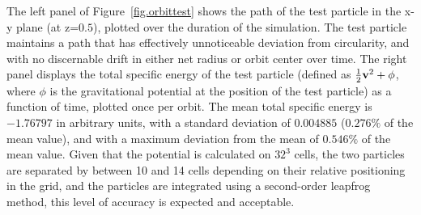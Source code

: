 The left panel of Figure~\ref{fig.orbittest} shows the path of the
test particle in the x-y plane (at z=$0.5$), plotted over the duration
of the simulation.  The test particle maintains a path that has
effectively unnoticeable deviation from circularity, and with no
discernable drift in either net radius or orbit center over time.  The
right panel displays the total specific energy of the test particle
(defined as $\frac{1}{2} {\bf v}^2 + \phi$, where $\phi$ is the
gravitational potential at the position of the test particle) as a
function of time, plotted once per orbit.  The mean total specific
energy is $-1.76797$ in arbitrary units, with a standard deviation of
$0.004885$ ($0.276\%$ of the mean value), and with a maximum deviation
from the mean of $0.546\%$ of the mean value.  Given that the
potential is calculated on $32^3$ cells, the two particles are
separated by between 10 and 14 cells depending on their relative
positioning in the grid, and the particles are integrated using a
second-order leapfrog method, this level of accuracy is expected and
acceptable.
